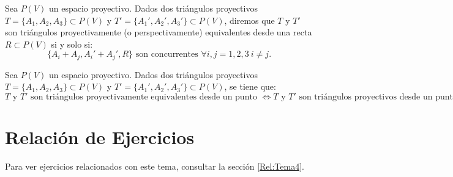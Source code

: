 \begin{definicion}
    Sea $P(V)$ un espacio proyectivo.
    Dados dos triángulos proyectivos $T = \{A_1, A_2, A_3\}\subset P(V)$ y $T' = \{A_1', A_2', A_3'\}\subset P(V)$,
    diremos que $T$ y $T'$ son triángulos proyectivamente (o perspectivamente) equivalentes desde una recta $R \subset P(V)$ si y solo si:
    \begin{equation*}
        \{A_i + A_j, A_i' + A_j', R\} \text{ son concurrentes } \forall i,j=1,2,3~i\neq j.
    \end{equation*}
\end{definicion}



\begin{teo}
    Sea $P(V)$ un espacio proyectivo.
    Dados dos triángulos proyectivos $T = \{A_1, A_2, A_3\}\subset P(V)$ y $T' = \{A_1', A_2', A_3'\}\subset P(V)$,
    se tiene que:
    \begin{equation*}
        T \text{ y } T' \text{ son triángulos proyectivamente equivalentes desde un punto } \Leftrightarrow T \text{ y } T' \text{ son triángulos proyectivos desde
        un punto } \Leftrightarrow T \text{ y } T' \text{ son triángulos proyectivamente equivalentes desde una recta } \Leftrightarrow T \text{ y } T' \text{ son triángulos proyectivos desde una recta}.
    \end{equation*}
\end{teo}




\section{Relación de Ejercicios}

Para ver ejercicios relacionados con este tema, consultar la sección \ref{Rel:Tema4}.